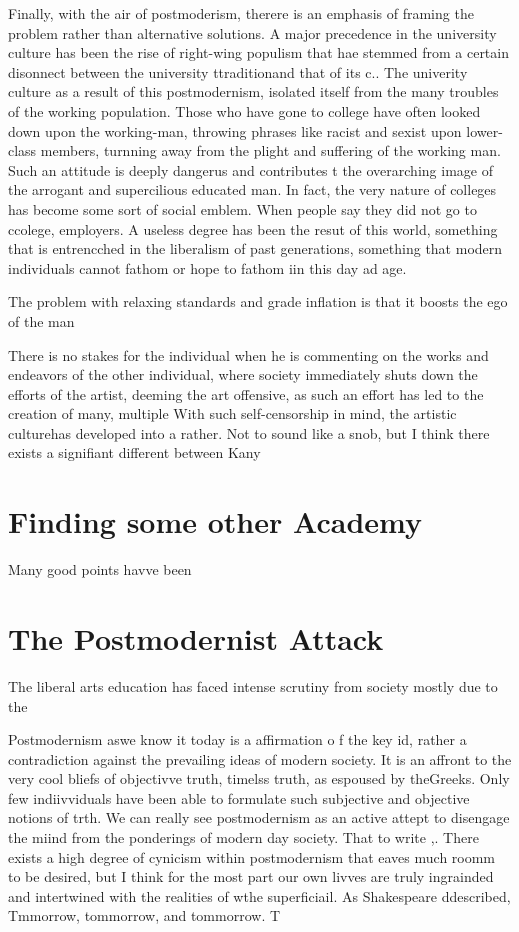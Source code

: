\documentclass[12pt,letterpaper]{article}
\begin{document}
Finally, with the air of postmoderism, therere is an emphasis of framing the problem rather than alternative solutions.  A major precedence in the university culture has been the rise of right-wing populism that hae stemmed from a certain disonnect between the university ttraditionand that of its c..  The univerity culture as a result of this postmodernism, isolated itself from the many troubles of the working population.  Those who have gone to college have often looked down upon the working-man, throwing phrases like racist and sexist upon lower-class members, turnning away from the plight and suffering of the working man.  Such an attitude is deeply dangerus and contributes t the overarching image of the arrogant and supercilious educated man.  In fact, the very nature of colleges has become some sort of social emblem.  When people say they did not go to ccolege, employers.  A useless degree has been the resut of this world, something that is entrencched in the liberalism of past generations, something that modern individuals cannot fathom or hope to fathom iin this day ad age.

The problem with relaxing standards  and grade inflation is that it boosts the ego of the man


There is no stakes for the individual when he is commenting on the works and endeavors of the other individual, where society immediately shuts down the efforts of the artist, deeming the art offensive, as such an effort has led to the creation of many, multiple 
With such self-censorship in mind, the artistic culturehas developed into a rather.  Not to sound like a snob, but I think there exists a signifiant different between Kany



\section{Finding some other Academy}

Many good points havve been 


\section{The Postmodernist Attack}


The liberal arts education has faced intense scrutiny from society mostly due to the

Postmodernism aswe know it today is a affirmation o f the key id, rather a contradiction against the prevailing ideas of modern society.  It is an affront to the very cool bliefs of objectivve truth, timelss truth, as espoused by theGreeks.  Only few indiivviduals have been able to formulate such subjective and objective notions of trth.  We can really see postmodernism as an active attept to disengage the miind from the ponderings of modern day society.  That to write ,.  There exists a high degree of cynicism within postmodernism that eaves much roomm to be desired, but I think for the most part our own livves are truly ingrainded and intertwined with the realities of wthe superficiail.  As Shakespeare ddescribed, Tmmorrow, tommorrow, and tommorrow.  T
\end{document}
